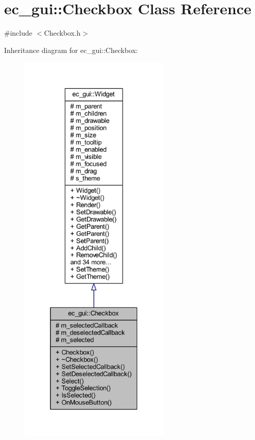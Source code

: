 \hypertarget{classec__gui_1_1_checkbox}{}\section{ec\+\_\+gui\+:\+:Checkbox Class Reference}
\label{classec__gui_1_1_checkbox}


{\ttfamily \#include $<$Checkbox.\+h$>$}



Inheritance diagram for ec\+\_\+gui\+:\+:Checkbox\+:\nopagebreak
\begin{figure}[H]
\begin{center}
\leavevmode
\includegraphics[height=550pt]{classec__gui_1_1_checkbox__inherit__graph}
\end{center}
\end{figure}



